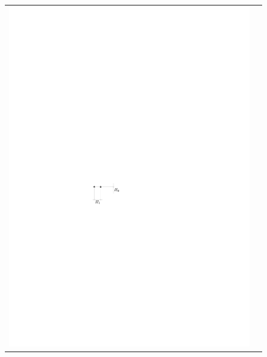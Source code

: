 \documentclass{ws-ijcga}
\begin{document}
\begin{figure}
  \centering
  \begin{tabular}{cc}
      \includegraphics{i1.pdf} & 

\end{tabular}
\end{figure}
\end{document}
